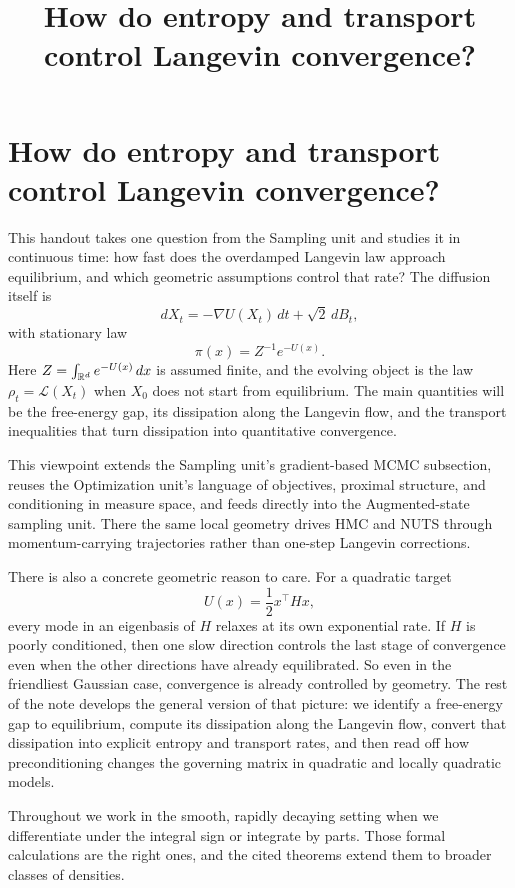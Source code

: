\documentclass[11pt]{article}
\title{How do entropy and transport control Langevin convergence?}
\author{}
\date{}
\begin{document}
\maketitle

\section[Entropy, transport, and Langevin]{How do entropy and transport control Langevin convergence?}
\label{sec:langevin-handout-opening}

This handout takes one question from the Sampling unit and studies it in continuous time: how fast does the overdamped Langevin law approach equilibrium, and which geometric assumptions control that rate?
The diffusion itself is
\[
dX_t=-\nabla U(X_t)\,dt+\sqrt{2}\,dB_t,
\]
with stationary law
\[
\pi(x)=Z^{-1}e^{-U(x)}.
\]
Here $Z=\int_{\mathbb{R}^d} e^{-U(x)}\,dx$ is assumed finite, and the evolving object is the law $\rho_t=\mathcal{L}(X_t)$ when $X_0$ does not start from equilibrium.
The main quantities will be the free-energy gap, its dissipation along the Langevin flow, and the transport inequalities that turn dissipation into quantitative convergence.

This viewpoint extends the Sampling unit's gradient-based MCMC subsection, reuses the Optimization unit's language of objectives, proximal structure, and conditioning in measure space, and feeds directly into the Augmented-state sampling unit.
There the same local geometry drives HMC and NUTS through momentum-carrying trajectories rather than one-step Langevin corrections.

There is also a concrete geometric reason to care.
For a quadratic target
\[
U(x)=\frac12 x^\top Hx,
\]
every mode in an eigenbasis of $H$ relaxes at its own exponential rate.
If $H$ is poorly conditioned, then one slow direction controls the last stage of convergence even when the other directions have already equilibrated.
So even in the friendliest Gaussian case, convergence is already controlled by geometry.
The rest of the note develops the general version of that picture:
we identify a free-energy gap to equilibrium, compute its dissipation along the Langevin flow, convert that dissipation into explicit entropy and transport rates, and then read off how preconditioning changes the governing matrix in quadratic and locally quadratic models.

Throughout we work in the smooth, rapidly decaying setting when we differentiate under the integral sign or integrate by parts.
Those formal calculations are the right ones, and the cited theorems extend them to broader classes of densities.
\end{document}
